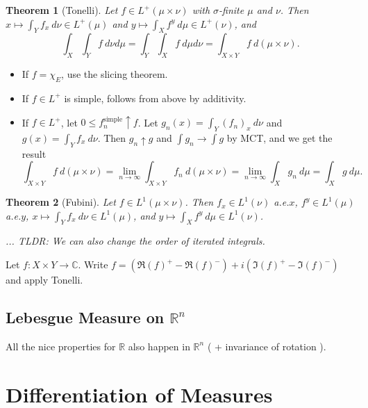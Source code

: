 \documentclass[11pt]{article}
\newtheorem{thm}{Theorem}[section]
\theoremstyle{definition}
\newcommand{\RR}{\mathbb{R}}
\newcommand{\CC}{\mathbb{C}}
\begin{document}
\begin{thm}[Tonelli]
Let $f\in L^+(\mu\times\nu)$ with $\sigma$-finite $\mu$ and $\nu$. Then
$x\mapsto\int_Yf_x~d\nu\in L^+(\mu)$ and $y\mapsto\int_Xf^y~d\mu\in L^+(\nu)$, and
\[
  \int_X\int_Yf~d\nu d\mu = \int_Y\int_Xf~d\mu d\nu = \int_{X\times Y}f~d(\mu\times\nu) . 
\]
\end{thm}
\proof
  \begin{itemize}
    \item If $f=\chi_E$, use the slicing theorem. 
    \item If $f\in L^+$ is simple, follows from above by additivity.
    \item If $f\in L^+$, let $0\le f_n^\text{simple}\uparrow f$. Let
    $g_n(x)=\int_Y(f_n)_x~d\nu$ and $g(x)=\int_Yf_x~d\nu$. Then $g_n\uparrow g$ and $\int
    g_n \to \int g$ by MCT, and we get the result
    \[
      \int_{X\times Y}f~d(\mu\times\nu) = \lim_{n\to\infty}\int_{X\times
      Y}f_n~d(\mu\times\nu) = \lim_{n\to\infty}\int_Xg_n~d\mu = \int_Xg~d\mu .
    \]
  \end{itemize}
\qedhere

\begin{thm}[Fubini]
  Let $f\in L^1(\mu\times\nu)$. Then $f_x\in L^1(\nu)$ a.e.$x$, $f^y\in L^1(\mu)$ a.e.$y$,
  $x\mapsto\int_Yf_x~d\nu\in L^1(\mu)$, and $y\mapsto\int_Xf^y~d\mu\in L^1(\nu)$. 

  ... TLDR: We can also change the order of iterated integrals. 
\end{thm}
\proof
  Let $f:X\times Y\to\CC$. Write $f=(\Re(f)^+-\Re(f)^-)+i(\Im(f)^+-\Im(f)^-)$ and apply
  Tonelli. 
\qedhere

\subsection{Lebesgue Measure on $\RR^n$}
All the nice properties for $\RR$ also happen in $\RR^n$ ( + invariance of rotation ). 







\section{Differentiation of Measures}
\end{document}
